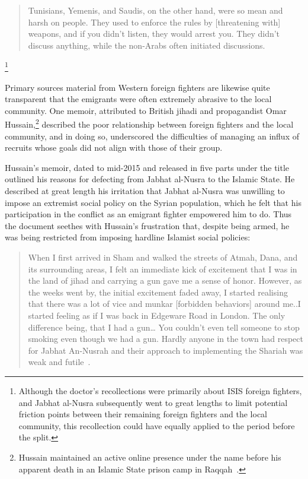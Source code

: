\begin{quote}
Tunisians, Yemenis, and Saudis, on the other hand, were so mean and harsh on people. They used to enforce the rules by [threatening with] weapons, and if you didn't listen, they would arrest you. They didn't discuss anything, while the non-Arabs often initiated discussions.\end{quote}\footnote{Although the doctor's recollections were primarily about ISIS foreign fighters, and Jabhat al-Nusra subsequently went to great lengths to limit potential friction points between their remaining foreign fighters and the local community, this recollection could have equally applied to the period before the split.}~\autocite[159]{mironova2019freedom}  

Primary sources material from Western foreign fighters are likewise quite transparent that the emigrants were often extremely abrasive to the local community. One memoir, attributed to British jihadi and propagandist Omar Hussain,\footnote{Hussain maintained an active online presence under the name  before his apparent death in an Islamic State prison camp in Raqqah~\autocite{farrall2017abusaeed}. } described the poor relationship between foreign fighters and the local community, and in doing so, underscored the difficulties of managing an influx of recruits whose goals did not align with those of their group.  

Hussain's memoir, dated to mid-2015 and released in five parts under the title  outlined his reasons for defecting from Jabhat al-Nusra to the Islamic State. He described at great length his irritation that Jabhat al-Nusra was unwilling to impose an extremist social policy on the Syrian population, which he felt that his participation in the conflict as an emigrant fighter empowered him to do.  Thus the document seethes with Hussain's frustration that, despite being armed, he was being restricted from imposing hardline Islamist social policies:

\begin{quote}
When I first arrived in Sham and walked the streets of Atmah, Dana, and its surrounding areas, I felt an immediate kick of excitement that I was in the land of jihad and carrying a gun gave me a sense of honor. However, as the weeks went by, the initial excitement faded away, I started realising that there was a lot of vice and munkar [forbidden behaviors] around me..I started feeling as if I was back in Edgeware Road in London. The only difference being, that I had a gun… You couldn't even tell someone to stop smoking even though we had a gun. Hardly anyone in the town had respect for Jabhat An-Nusrah and their approach to implementing the Shariah was weak and futile~\autocite{hussein2015exposing}.\end{quote}

